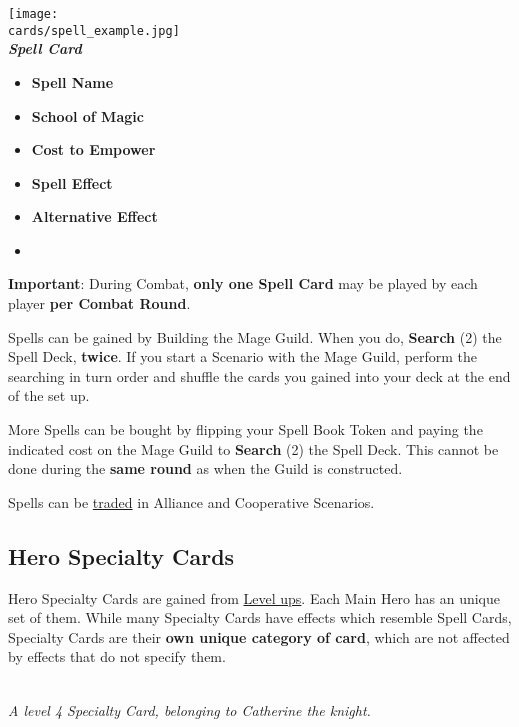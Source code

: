 \begin{multicols*}{2}
\filbreak
\begin{center}
  \texttt{[image: \\cards/spell\_example.jpg]}\\
  \medskip
  \footnotesize{\textbf{\textit{\textcolor{darkcandyapplered}{Spell Card}}}}
  \scriptsize
  \begin{multicols}{2}
    \begin{itemize}[itemsep=5pt]
      \item[\textbf{1.}] \textbf{Spell Name}
      \item[\textbf{2.}] \textbf{School of Magic}
      \item[\textbf{3.}] \textbf{Cost to Empower}
      \item[\textbf{4.}] \textbf{Spell Effect}
      \item[\textbf{5.}] \textbf{Alternative Effect}
      \item[]
    \end{itemize}
  \end{multicols}
\end{center}

\textbf{Important}: During Combat, \textbf{only one Spell Card} may be played by each player \textbf{per Combat Round}.\par
Spells can be gained by Building the Mage Guild.
When you do, \textbf{Search} (2) the Spell Deck, \textbf{twice}.
If you start a Scenario with the Mage Guild, perform the searching in turn order and shuffle the cards you gained into your deck at the end of the set up.\par
More Spells can be bought by flipping your Spell Book Token and paying the indicated cost on the Mage Guild to \textbf{Search} (2) the Spell Deck.
This cannot be done during the \textbf{same round} as when the Guild is constructed.\par
Spells can be \hyperlink{Trading}{traded} in Alliance and Cooperative Scenarios.

\subsection*{\hypertarget{Specialty}{Hero Specialty Cards}}

Hero Specialty Cards are gained from \hyperlink{Level}{Level ups}.
Each Main Hero has an unique set of them.
While many Specialty Cards have effects which resemble Spell Cards, Specialty Cards are their \textbf{own unique category of card}, which are not affected by effects that do not specify them.

\begin{center}
  \\
  \medskip
  \scriptsize\textit{A level 4 Specialty Card, belonging to Catherine the knight.}
\end{center}


\end{multicols*}
